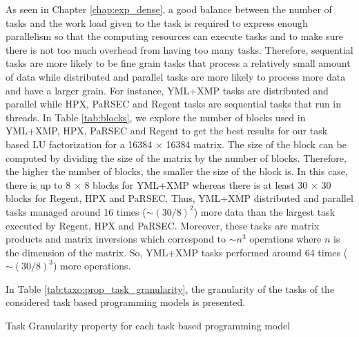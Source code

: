 As seen in Chapter \ref{chap:exp_dense}, a good balance between the number of tasks and the work load given to the task is required to express enough parallelism so that the computing resources can execute tasks and to make sure there is not too much overhead from having too many tasks.
Therefore, sequential tasks are more likely to be fine grain tasks that process a relatively small amount of data while distributed and parallel tasks are more likely to process more data and have a larger grain.
For instance, YML+XMP tasks are distributed and parallel while HPX, PaRSEC and Regent tasks are sequential tasks that run in threads.
In Table \ref{tab:blocks}, we explore the number of blocks used in YML+XMP, HPX, PaRSEC and Regent to get the best results for our task based LU factorization for a 16384 $\times$ 16384 matrix.
The size of the block can be computed by dividing the size of the matrix by the number of blocks.
Therefore, the higher the number of blocks, the smaller the size of the block is.
In this case, there is up to 8 $\times$ 8 blocks for YML+XMP whereas there is at least 30 $\times$ 30 blocks for Regent, HPX and PaRSEC.
Thus, YML+XMP distributed and parallel tasks managed around 16 times ($ \sim (30/8)^2 $) more data than the largest task executed by Regent, HPX and PaRSEC.
Moreover, these tasks are matrix products and matrix inversions which correspond to $\sim n^3$ operations where $n$ is the dimension of the matrix.
So, YML+XMP tasks performed around 64 times ($ \sim (30/8)^3 $) more operations.

In Table \ref{tab:taxo:prop_task_granularity}, the granularity of the tasks of the considered task based programming models is presented.

\begin{table}[H]
	\caption{Task Granularity property for each task based programming model \label{tab:taxo:prop_task_granularity}}
	\centering
	\begin{multicols}{2}
		

		
	\end{multicols}
\end{table}

